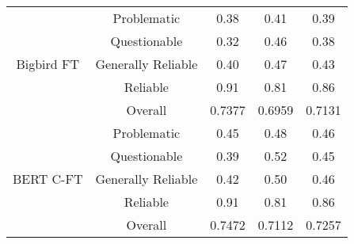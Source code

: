 \begin{table}[htbp]
\begin{tabular}{| c | c | c | c | c |}
        \hline
        \multirow{5}{*}{Bigbird FT}                        & Problematic        & 0.38               & 0.41            & 0.39            \\
                                                           & Questionable       & 0.32               & 0.46            & 0.38            \\
                                                           & Generally Reliable & 0.40               & 0.47            & 0.43            \\
                                                           & Reliable           & 0.91               & 0.81            & 0.86            \\\cline{2-5}
                                                           & Overall            & 0.7377             & 0.6959          & 0.7131          \\
        \hline
        \multirow{5}{*}{BERT C-FT}                         & Problematic        & 0.45               & 0.48            & 0.46            \\
                                                           & Questionable       & 0.39               & 0.52            & 0.45            \\
                                                           & Generally Reliable & 0.42               & 0.50            & 0.46            \\
                                                           & Reliable           & 0.91               & 0.81            & 0.86            \\\cline{2-5}
                                                           & Overall            & 0.7472             & 0.7112          & 0.7257          \\
        \hline

\end{tabular}
\end{table}
